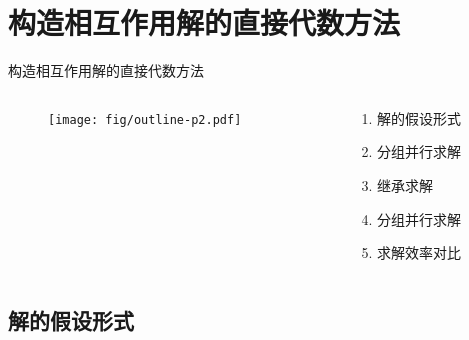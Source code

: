 \documentclass[handout]{beamer}
\newcommand{\sbrace}[1]{\left(#1\right)}
\newcommand{\bbrace}[1]{\left\{#1\right\}}
\begin{document}
\section{构造相互作用解的直接代数方法}
\begin{frame}{构造相互作用解的直接代数方法}
\begin{columns}
\begin{column}{0.5\textwidth}
  \begin{figure}
    \centering
    \texttt{[image: fig/outline-p2.pdf]}
  \end{figure}
\end{column}
\begin{column}{0.5\textwidth}
  \begin{enumerate}
  \item 解的假设形式
  \item 分组并行求解
  \item 继承求解
  \item 分组并行求解
  \item 求解效率对比
  \end{enumerate}
\end{column}
\end{columns}
\end{frame}

\subsection{解的假设形式}
\end{document}
